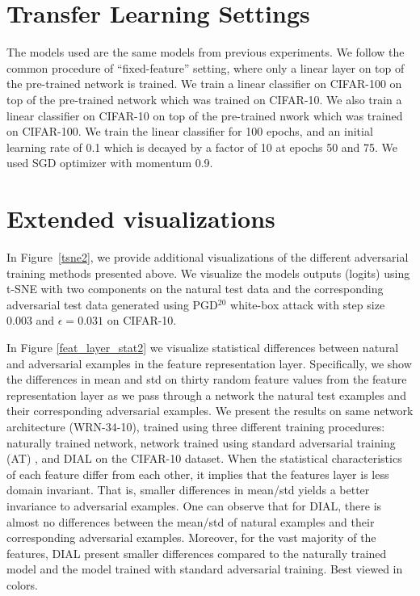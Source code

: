 


\section{Transfer Learning Settings}
\label{transfer-learning-settings}
The models used are the same models from previous experiments. We follow the common procedure of “fixed-feature” setting, where only a linear layer on top of the pre-trained network is trained. 
We train a linear classifier on CIFAR-100 on top of the pre-trained network which was trained on CIFAR-10. We also train a linear classifier on CIFAR-10 on top of the pre-trained nwork which was trained on CIFAR-100. We train the linear classifier for 100 epochs, and an initial learning rate of 0.1 which is decayed by a factor of 10 at epochs 50 and 75. We used SGD optimizer with momentum 0.9.

\section{Extended visualizations} \label{additional_viz}
In Figure~\ref{tsne2}, we provide additional visualizations of the different adversarial training methods presented above. We visualize the models outputs (logits) using t-SNE with two components on the natural test data and the corresponding adversarial test data generated using PGD$^{20}$ white-box attack with step size 0.003 and $\epsilon=0.031$ on CIFAR-10. 

In Figure \ref{feat_layer_stat2} we visualize statistical differences between natural and adversarial examples in the feature representation layer. Specifically, we show the differences in mean and std on thirty random feature values from the feature representation layer as we pass through a network the natural test examples and their corresponding adversarial examples. We present the results on same network architecture (WRN-34-10), trained using three different training procedures: naturally trained network, network trained using standard adversarial training (AT) \cite{madry2017towards}, and DIAL on the CIFAR-10 dataset. When the statistical characteristics of each feature differ from each other, it implies that the features layer is less domain invariant. That is, smaller differences in mean/std yields a better invariance to adversarial examples. One can observe that for DIAL, there is almost no differences between the mean/std of natural examples and their corresponding adversarial examples. Moreover, for the vast majority of the features, DIAL present smaller differences compared to the naturally trained model and the model trained with standard adversarial training. Best viewed in colors.

